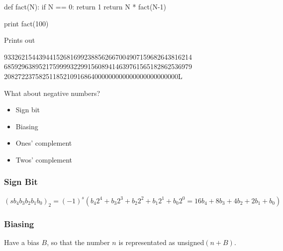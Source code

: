 \begin{frame}[fragile]
\begin{python}
def fact(N):
     if N == 0: return 1
     return N * fact(N-1)

print  fact(100)
\end{python}

Prints out

933262154439441526816992388562667004907159682643816214\\
685929638952175999932299156089414639761565182862536979\\
20827223758251185210916864000000000000000000000000L

\end{frame}

\begin{frame}[fragile]

What about negative numbers?

\end{frame}

\begin{frame}[fragile]

\begin{itemize}
\item Sign bit
\item Biasing
\item Ones' complement
\item Twos' complement
\end{itemize}
\end{frame}

\begin{frame}[fragile]
\frametitle{Sign Bit}

$(s b_4 b_3 b_2 b_1 b_0)_2 = (-1)^s \left(b_4 2^4 + b_3 2^3 + b_2 2^2 + b_1 2^1 + b_0 2^0 = 16b_4 + 8b_3 + 4b_2 + 2 b_1 + b_0\right)$

\end{frame}

\begin{frame}[fragile]
\frametitle{Biasing}

Have a bias $B$, so that the number $n$ is representated as unsigned$(n+B)$.

\end{frame}

